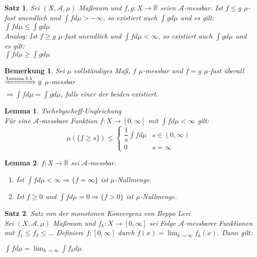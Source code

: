 \documentclass[11pt]{memoir}
\theoremstyle{changebreak}
\newtheorem{Bemerkung}{Bemerkung}[chapter]
\newtheorem{Lemma}{Lemma}[chapter]
\newtheorem{Satz}{Satz}[chapter]
\begin{document}
\begin{Satz}
Sei $(X, \mathscr A, \mu)$ Maßraum und $f, g: X \rightarrow \overline{\mathbb R}$ seien $\mathscr A$-messbar. Ist $f \leq g$ $\mu$-fast unendlich und $\int f d\mu > -\infty$, so existiert auch $\int g d\mu$ und es gilt: \\
$\int f d\mu \leq \int g d\mu$ \\
Analog:  Ist $f \geq g$ $\mu$-fast unendlich und $\int f d\mu < \infty$, so existiert auch $\int g d\mu$ und es gilt: \\
$\int f d\mu \geq \int g d\mu$
\end{Satz}

\begin{Bemerkung}
Sei $\mu$ vollständiges Maß, $f$ $\mu$-messbar und $f = g$ $\mu$-fast überall \\
$\xRightarrow{\text{Lemma I.5}} g$ $\mu$-messbar \\
$\Rightarrow \int f d\mu = \int g d\mu$, falls einer der beiden existiert.
\end{Bemerkung}

\begin{Lemma}
\emph{Tschebyscheff-Ungleichung} \\
Für eine $\mathscr A$-messbare Funktion $f: X \rightarrow [0, \infty]$ mit $\int f d\mu < \infty$ gilt: \\
\begin{equation}
	\mu(\{f \geq s\}) \leq
	\begin{cases}
		\dfrac{1}{s}\int f d\mu & s \in (0, \infty) \\
		0 & s = \infty
	\end{cases}
\end{equation}
\end{Lemma}

\begin{Lemma}
$f: X \rightarrow \overline{\mathbb R}$ sei $\mathscr A$-messbar.
\begin{enumerate}
	\item Ist $\int f d\mu < \infty \Rightarrow \{f = \infty\}$ ist $\mu$-Nullmenge.
	\item Ist $f \geq 0$ und $\int f d\mu = 0 \Rightarrow \{f > 0\}$ ist $\mu$-Nullmenge.
\end{enumerate}
\end{Lemma}




\begin{Satz}
\emph{Satz von der monotonen Konvergenz von Beppo Levi} \\
Sei $(X, \mathscr A, \mu)$ Maßraum und $f_k: X \rightarrow [0, \infty]$ sei Folge $\mathscr A$-messbarer Funktionen mit $f_1 \leq f_2 \leq ...$ Definiere $f: [0, \infty]$ durch $f(x) = \lim_{k \rightarrow \infty} f_k (x)$. Dann gilt:
\begin{center}
	$\int f d\mu = \lim_{k\rightarrow \infty} \int f_k d\mu$
\end{center}
\end{Satz}
\end{document}
